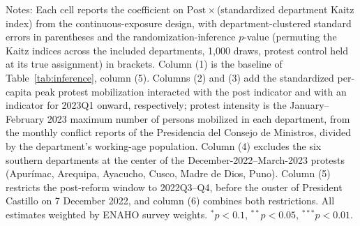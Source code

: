 \begin{table}[!tbp]
\begin{threeparttable}
\begin{tablenotes}
\item Notes: Each cell reports the coefficient on $\mathrm{Post}\times$(standardized department Kaitz index) from the continuous-exposure design, with department-clustered standard errors in parentheses and the randomization-inference $p$-value (permuting the Kaitz indices across the included departments, 1{,}000 draws, protest control held at its true assignment) in brackets. Column (1) is the baseline of Table~\ref{tab:inference}, column (5). Columns (2) and (3) add the standardized per-capita peak protest mobilization interacted with the post indicator and with an indicator for 2023Q1 onward, respectively; protest intensity is the January--February 2023 maximum number of persons mobilized in each department, from the monthly conflict reports of the Presidencia del Consejo de Ministros, divided by the department's working-age population. Column (4) excludes the six southern departments at the center of the December-2022--March-2023 protests (Apur\'imac, Arequipa, Ayacucho, Cusco, Madre de Dios, Puno). Column (5) restricts the post-reform window to 2022Q3--Q4, before the ouster of President Castillo on 7 December 2022, and column (6) combines both restrictions. All estimates weighted by ENAHO survey weights. $^{*}p<0.1$, $^{**}p<0.05$, $^{***}p<0.01$.
\end{tablenotes}
\end{threeparttable}\end{table}
